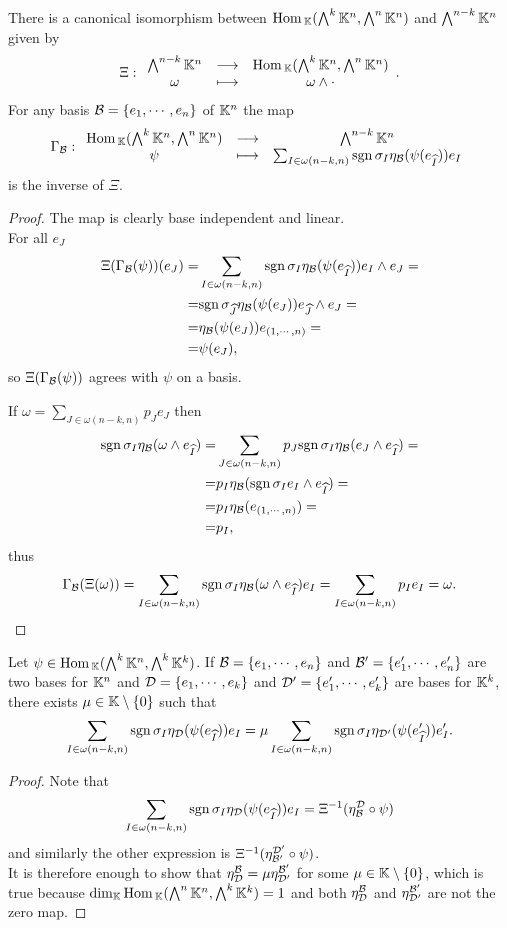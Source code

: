 \begin{proposition}\label{CanonicalIso}
There is a canonical isomorphism between $\mathrm{Hom}\,_{\mathbb{K}}(\bigwedge^k\mathbb{K}^n,\bigwedge^n\mathbb{K}^n)$ and $\bigwedge^{n-k}\mathbb{K}^n$ given by
\[\Xi:\begin{array}{ccc} {\bigwedge^{n-k}\mathbb{K}^n} & \longrightarrow & {\mathrm{Hom}\,_{\mathbb{K}}(\bigwedge^k\mathbb{K}^n, \bigwedge^n\mathbb{K}^n)}\\ {\omega} & \longmapsto & {\omega\wedge \cdot} \end{array}.\]
For any basis $\mathcal{B}=\left\{{e_1,\cdots, e_n}\right\}$ of $\mathbb{K}^n$ the map 
\[\Gamma_{\mathcal{B}}:\begin{array}{ccc} {\mathrm{Hom}\,_{\mathbb{K}}(\bigwedge^k\mathbb{K}^n,\bigwedge^n\mathbb{K}^n)} & \longrightarrow & {\bigwedge^{n-k}\mathbb{K}^n}\\ {\psi} & \longmapsto & {\sum_{I\in\omega(n-k,n)}\mathrm{sgn}\,\sigma_I\eta_{\mathcal{B}}(\psi(e_{\widehat{I}}))e_I} \end{array}\]
is the inverse of $\Xi$.
\end{proposition}
\begin{proof}
The map is clearly base independent and linear.\\
For all $e_J$
\begin{align*}
\Xi(\Gamma_{\mathcal{B}}(\psi))(e_J)=&\sum_{I\in\omega(n-k,n)}\mathrm{sgn}\,\sigma_I\eta_{\mathcal{B}}(\psi(e_{\widehat{I}}))e_I\wedge e_J=\\
=&\mathrm{sgn}\,\sigma_{\widehat{J}}\eta_{\mathcal{B}}(\psi(e_{J}))e_{\widehat{J}}\wedge e_J=\\
=&\eta_{\mathcal{B}}(\psi(e_{J}))e_{(1,\cdots,n)}=\\
=&\psi(e_{J}),
\end{align*}
so $\Xi(\Gamma_{\mathcal{B}}(\psi))$ agrees with $\psi$ on a basis.\medskip

\noindent
If $\omega=\sum_{J\in\omega(n-k,n)} p_J e_J$ then
\begin{align*}
\mathrm{sgn}\,\sigma_I\eta_{\mathcal{B}}(\omega\wedge e_{\widehat{I}})=&\sum_{J\in\omega(n-k,n)}p_J\mathrm{sgn}\,\sigma_I\eta_{\mathcal{B}}(e_J\wedge e_{\widehat{I}})=\\
=&p_I\eta_{\mathcal{B}}(\mathrm{sgn}\, \sigma_I e_I\wedge e_{\widehat{I}})=\\
=&p_I\eta_{\mathcal{B}}(e_{(1,\cdots, n)})=\\
=&p_I,
\end{align*}
thus \[\Gamma_{\mathcal{B}}(\Xi(\omega))=\sum_{I\in\omega(n-k,n)}\mathrm{sgn}\,\sigma_I\eta_{\mathcal{B}}(\omega\wedge e_{\widehat{I}})e_I=\sum_{I\in\omega(n-k,n)}p_Ie_I=\omega.\]
\end{proof}
\begin{corollary}\label{UpToScalarCanonicalIso}
Let $\psi\in \mathrm{Hom}\,_{\mathbb{K}}(\bigwedge^k\mathbb{K}^n,\bigwedge^k\mathbb{K}^k)$. If $\mathcal{B}=\left\{{e_1,\cdots, e_n}\right\}$ and $\mathcal{B}'=\left\{{e_1',\cdots, e_n'}\right\}$ are two bases for $\mathbb{K}^n$ and $\mathcal{D}=\left\{{e_1,\cdots,e_k}\right\}$ and $\mathcal{D}'=\left\{{e_1',\cdots,e_k'}\right\}$ are bases for $\mathbb{K}^k$, there exists $\mu\in\mathbb{K}\setminus\{0\}$ such that
\[\sum_{I\in\omega(n-k,n)}\mathrm{sgn}\,\sigma_I\eta_{\mathcal{D}}(\psi(e_{\widehat{I}}))e_I=\mu \sum_{I\in\omega(n-k,n)}\mathrm{sgn}\,\sigma_I\eta_{\mathcal{D}'}(\psi(e'_{\widehat{I}}))e'_I.\]
\end{corollary}
\begin{proof}
Note that
\[\sum_{I\in\omega(n-k,n)}\mathrm{sgn}\,\sigma_I\eta_{\mathcal{D}}(\psi(e_{\widehat{I}}))e_I=\Xi^{-1}(\eta^{\mathcal{D}}_{\mathcal{B}}\circ \psi)\]
and similarly the other expression is $\Xi^{-1}(\eta^{\mathcal{D}'}_{\mathcal{B}'}\circ \psi)$.\\
It is therefore enough to show that $\eta^{\mathcal{B}}_{\mathcal{D}}=\mu\eta^{\mathcal{B}'}_{\mathcal{D}'}$ for some $\mu\in \mathbb{K}\setminus\{0\}$, which is true because $\dim_{\mathbb{K}}\mathrm{Hom}\,_{\mathbb{K}}(\bigwedge^n\mathbb{K}^n,\bigwedge^k\mathbb{K}^k)=1$ and both $\eta^{\mathcal{B}}_{\mathcal{D}}$ and $\eta^{\mathcal{B}'}_{\mathcal{D}'}$ are not the zero map.
\end{proof}


